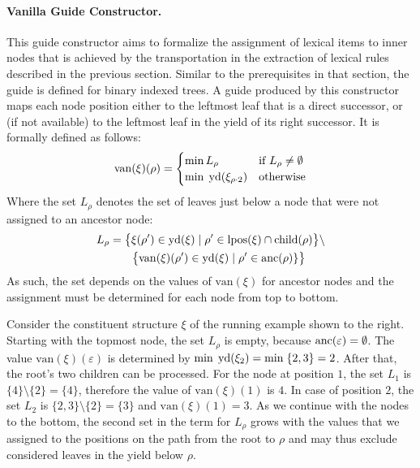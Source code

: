 \documentclass[../../document.tex]{subfiles}
\begin{document}
    \paragraph{Vanilla Guide Constructor.}
    This guide constructor aims to formalize the assignment of lexical items to inner nodes that is achieved by the transportation in the extraction of lexical  rules described in the previous section.
    Similar to the prerequisites in that section, the guide is defined for binary indexed trees.
    A guide produced by this constructor maps each node position either to the leftmost leaf that is a direct successor, or (if not available) to the leftmost leaf in the yield of its right successor.
    It is formally defined as follows:
    \[
    \mathrm{van}(\xi)(\rho) = \begin{cases}
        \min L_\rho & \text{if $L_\rho \neq \emptyset$} \\
        \min\;\operatorname{yd}(\xi_{\rho\cdot 2}) &\text{otherwise}
    \end{cases}
    \]
    Where the set \(L_\rho\) denotes the set of leaves just below a node that were not assigned to an ancestor node:
    \begin{align*}
        L_\rho &= \big\{\xi(\rho') \in \operatorname{yd}(\xi) \mid \rho' \in \operatorname{lpos}(\xi) \cap \operatorname{child}(\rho) \big\} \setminus \\
        &\qquad  \big\{\mathrm{van}(\xi)(\rho') \in \operatorname{yd}(\xi) \mid \rho' \in \operatorname{anc}(\rho)\} \big\}
    \end{align*}
    As such, the set depends on the values of \(\mathrm{van}(\xi)\) for ancestor nodes and the assignment must be determined for each node from top to bottom.

    \begin{wrapfigure}[6]{r}{.3\linewidth}
        \centering
        
    \end{wrapfigure}
    Consider the constituent structure \(\xi\) of the running example shown to the right.
    Starting with the topmost node, the set \(L_\rho\) is empty, because \(\operatorname{anc}(\varepsilon) = \emptyset\).
    The value \(\mathrm{van}(\xi)(\varepsilon)\) is determined by \(\min\;\operatorname{yd}(\xi_{2}) = \min\;\{2,3\} = 2\).
    After that, the root's two children can be processed.
    For the node at position \(1\), the set \(L_{1}\) is \(\{4\} \setminus \{2\} = \{4\}\), therefore the value of \(\mathrm{van}(\xi)(1)\) is \(4\).
    In case of position \(2\), the set \(L_{2}\) is \(\{2,3\} \setminus \{2\} = \{3\}\) and \(\mathrm{van}(\xi)(1)=3\).
    As we continue with the nodes to the bottom, the second set in the term for \(L_\rho\) grows with the values that we assigned to the positions on the path from the root to \(\rho\) and may thus exclude considered leaves in the yield below \(\rho\).
\end{document}
